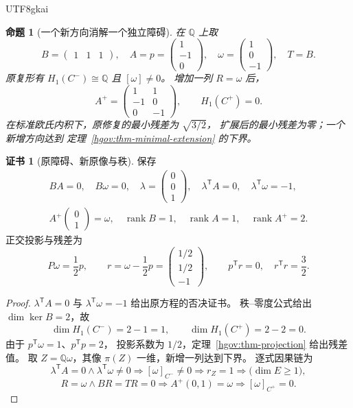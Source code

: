 \documentclass[12pt,a4paper,openany,notitlepage]{report}
\theoremstyle{plain}
\newtheorem{proposition}[theorem]{命题}
\theoremstyle{definition}
\newtheorem*{certificate}{证书}
\theoremstyle{remark}
\begin{document}
\begin{CJK*}{UTF8}{gkai}
\begin{proposition}[一个新方向消解一个独立障碍]
\label{hgov:prop-three-dimensional}
在 $\mathbb Q$ 上取
\[
 B=\begin{pmatrix}1&1&1\end{pmatrix},\quad
 A=p=\begin{pmatrix}1\\-1\\0\end{pmatrix},\quad
 \omega=\begin{pmatrix}1\\0\\-1\end{pmatrix},\quad T=B.
\]
原复形有 $H_1(C^-)\cong\mathbb Q$ 且 $[\omega]\ne0$。
增加一列 $R=\omega$ 后，
\[
 A^+=
 \begin{pmatrix}
 1&1\\-1&0\\0&-1
 \end{pmatrix},\qquad
 H_1(C^+)=0.
\]
在标准欧氏内积下，原修复的最小残差为 $\sqrt{3/2}$，
扩展后的最小残差为零；一个新增方向达到
定理~\ref{hgov:thm-minimal-extension} 的下界。
\end{proposition}
\begin{certificate}[原障碍、新原像与秩]
保存
\[
 \begin{gathered}
 BA=0,\quad B\omega=0,\quad
 \lambda=\begin{pmatrix}0\\0\\1\end{pmatrix},\quad
 \lambda^{\mathsf T}A=0,\quad
 \lambda^{\mathsf T}\omega=-1,\\
 A^+\begin{pmatrix}0\\1\end{pmatrix}=\omega,\quad
 \operatorname{rank}B=1,\quad
 \operatorname{rank}A=1,\quad
 \operatorname{rank}A^+=2.
 \end{gathered}
\]
正交投影与残差为
\[
 P\omega=\frac12p,\qquad
 r=\omega-\frac12p
   =\begin{pmatrix}1/2\\1/2\\-1\end{pmatrix},\qquad
 p^{\mathsf T}r=0,\quad r^{\mathsf T}r=\frac32.
\]
\end{certificate}
\begin{proof}
$\lambda^{\mathsf T}A=0$ 与
$\lambda^{\mathsf T}\omega=-1$ 给出原方程的否决证书。
秩--零度公式给出 $\dim\ker B=2$，故
\[
 \dim H_1(C^-)=2-1=1,\qquad
 \dim H_1(C^+)=2-2=0.
\]
由于 $p^{\mathsf T}\omega=1$、$p^{\mathsf T}p=2$，
投影系数为 $1/2$，定理~\ref{hgov:thm-projection} 给出残差值。
取 $Z=\mathbb Q\omega$，其像 $\pi(Z)$ 一维，新增一列达到下界。
逐式因果链为
\[
 \lambda^{\mathsf T}A=0\wedge
 \lambda^{\mathsf T}\omega\ne0
 \Longrightarrow[\omega]_{C^-}\ne0
 \Longrightarrow r_Z=1
 \Longrightarrow
 \bigl(\dim E\ge1\bigr),
\]
\[
 R=\omega\wedge BR=TR=0
 \Longrightarrow A^+(0,1)=\omega
 \Longrightarrow[\omega]_{C^+}=0.
\]
\end{proof}


\end{CJK*}
\end{document}
